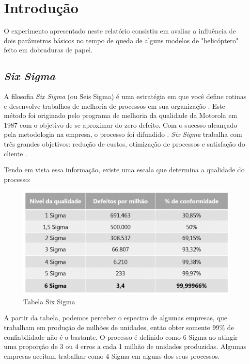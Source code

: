 \section{Introdução}

O experimento apresentado neste relatório consistiu em avaliar a influência de dois parâmetros básicos no tempo de queda de alguns modelos de "helicóptero" feito em dobraduras de papel.

\subsection{\textit{Six Sigma}}

A filosofia \textit{Six Sigma} (ou Seis Sigma) é uma estratégia em que você define rotinas e desenvolve trabalhos de melhoria de processos em sua organização \cite{sixsigma}. Este método foi originado pelo programa de melhoria da qualidade da Motorola em 1987 com o objetivo de se aproximar do zero defeito. Com o sucesso alcançado pela metodologia na empresa, o processo foi difundido \cite{correa}. \textit{Six Sigma} trabalha com três grandes objetivos: redução de custos, otimização de processos e satisfação do cliente \cite{sixsigma}.

Tendo em vista essa informação, existe uma escala que determina a qualidade do processo:

\begin{figure}[h]
  \centering
  \includegraphics[scale=0.7]{images/tabless.png}
  \caption{Tabela Six Sigma \cite{sixsigma}}
  \label{fig:sixsigma}
\end{figure}

A partir da tabela, podemos perceber o espectro de algumas empresas, que trabalham em produção de milhões de unidades, então obter somente 99\% de confiabilidade não é o bastante. O processo é definido como 6 Sigma ao atingir uma proporção de 3 ou 4 erros a cada 1 milhão de unidades produzidas. Algumas empresas aceitam trabalhar como 4 Sigma em alguns dos seus processos.

